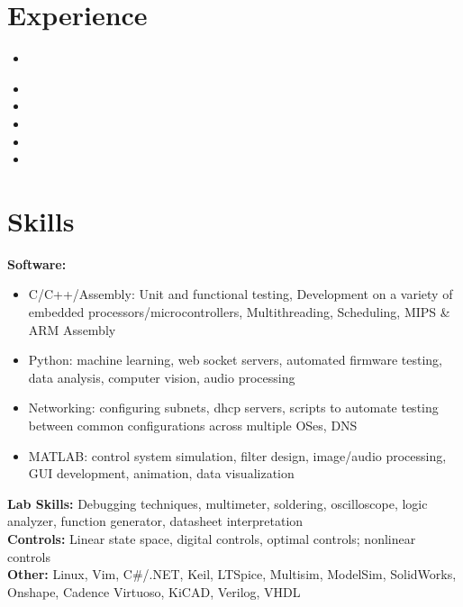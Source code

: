\documentclass[11pt, a4paper]{article}
\begin{document}
\headerSimple

\section*{Experience}
{\scriptsize

  \workplaceBeam
  \begin{itemize}
    \item \experienceBeamMedium
  \end{itemize}

  \workplaceGTRI
  \begin{itemize}
    \item \experienceGTRIEdgeMLLong
    \item \experienceGTRIFPGA
    \item \experienceGTRIGimbal
    \item \experienceGTRIEmbedded
    \item \experienceGTRIManagement
  \end{itemize}

  \workplaceClappingDetector

  \workplaceEmotionSpeech
  \experienceItemsEmotionSpeechLong

  \workplaceSeniorDesign
  
  \workplaceDDL

  \workplaceMLforT
  
  \workplaceConvexMind

}

\section*{Skills}
{\tiny
  \textbf{Software:}
  \begin{itemize}[noitemsep] %
    \item C/C++/Assembly: Unit and functional testing, Development on a variety of embedded processors/microcontrollers, Multithreading, Scheduling, MIPS \& ARM Assembly
    \item Python: machine learning, web socket servers, automated firmware testing, data analysis, computer vision, audio processing
    \item Networking: configuring subnets, dhcp servers, scripts to automate testing between common configurations across multiple OSes, DNS
    \item MATLAB: control system simulation, filter design, image/audio processing, GUI development, animation, data visualization
  \end{itemize}
  \textbf{Lab Skills:} Debugging techniques, multimeter, soldering, oscilloscope, logic analyzer, function generator, datasheet interpretation\\
  \textbf{Controls:} Linear state space, digital controls, optimal controls; nonlinear controls\\
  \textbf{Other:} Linux, Vim, C\#/.NET, Keil, LTSpice, Multisim, ModelSim, SolidWorks, Onshape, Cadence Virtuoso, KiCAD, Verilog, VHDL\par\noindent
}
\end{document}
